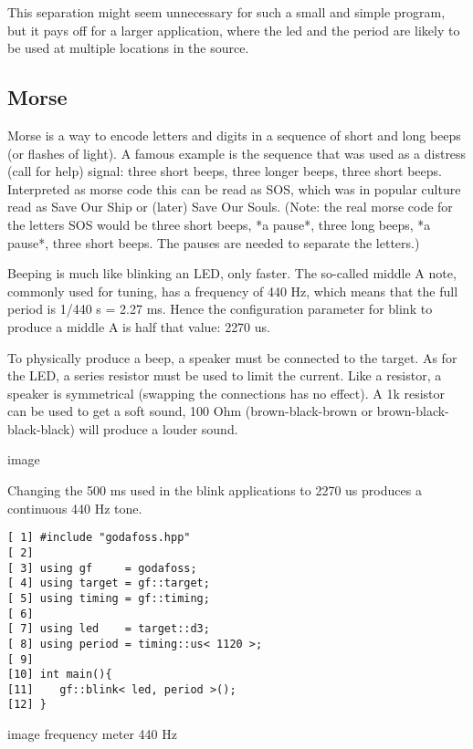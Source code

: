\documentclass{article}
\begin{document}
This separation might seem unnecessary for such a small and simple
program, but it pays off for a larger application,
where the led and the period are likely to be used at
multiple locations in the source.

\subsection{Morse}

Morse is a way to encode letters and digits in a sequence of 
short and long beeps (or flashes of light). 
A famous example is the sequence that was used as a distress
(call for help) signal: three short beeps, three longer beeps, 
three short beeps. 
Interpreted as morse code this can be read as SOS, 
which was in popular culture read as Save Our Ship or 
(later) Save Our Souls.
(Note: the real morse code for the letters SOS would be
three short beeps, *a pause*, three long beeps, *a pause*,
three short beeps. The pauses are needed to separate the letters.)

Beeping is much like blinking an LED, only faster.
The so-called middle A note, commonly used for tuning, has a frequency 
of 440 Hz, which means that the full period is 1/440 s = 2.27 ms.
Hence the configuration parameter for blink to produce a middle A
is half that value: 2270 us.

To physically produce a beep, a speaker must be connected to the target.
As for the LED, a series resistor must be used to limit the current.
Like a resistor, a speaker is symmetrical 
(swapping the connections has no effect).
A 1k resistor can be used to get a soft sound, 100 Ohm 
(brown-black-brown or brown-black-black-black)
will produce a louder sound.

image

Changing the 500 ms used in the blink applications to 2270 us produces
a continuous 440 Hz tone.

\lstset {language=C++}
\begin{lstlisting}
[ 1] #include "godafoss.hpp"
[ 2] 
[ 3] using gf     = godafoss;
[ 4] using target = gf::target;
[ 5] using timing = gf::timing;
[ 6] 
[ 7] using led    = target::d3;
[ 8] using period = timing::us< 1120 >; 
[ 9] 
[10] int main(){
[11]    gf::blink< led, period >();
[12] }
\end{lstlisting}

image frequency meter 440 Hz
\end{document}
